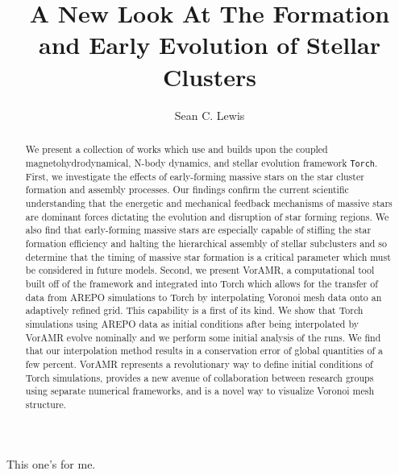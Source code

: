 \documentclass[twoside]{drexel-thesis}
\author{Sean C. Lewis}    %
\title{A New Look At The Formation and Early Evolution of Stellar Clusters}     %
\begin{document}
\begin{preamble}

\begin{dedications} %
\centerline{This one's for me.} 
\end{dedications}

\begin{acknowledgments} 

\end{acknowledgments}

\tableofcontents
\listoftables  %
\listoffigures %

\begin{abstract}
We present a collection of works which use and builds upon the coupled magnetohydrodynamical, N-body dynamics, and stellar evolution framework \texttt{Torch}. First, we investigate the effects of early-forming massive stars on the star cluster formation and assembly processes. Our findings confirm the current scientific understanding that the energetic and mechanical feedback mechanisms of massive stars are dominant forces dictating the evolution and disruption of star forming regions. We also find that early-forming massive stars are especially capable of stifling the star formation efficiency and halting the hierarchical assembly of stellar subclusters and so determine that the timing of massive star formation is a critical parameter which must be considered in future models. Second, we present VorAMR, a computational tool
built off of the  framework and integrated into Torch which allows for the transfer of data from AREPO simulations to Torch  by interpolating Voronoi mesh data onto an adaptively refined grid. This capability is a first of its kind. We show that Torch simulations using AREPO data as initial conditions after being interpolated by VorAMR evolve nominally and we perform some initial analysis of the runs. We find that our interpolation method results in a conservation error of global quantities of a few percent. VorAMR represents a revolutionary way to define initial conditions of Torch simulations, provides a new avenue of collaboration between research groups using separate numerical frameworks, and is a novel way to visualize Voronoi mesh structure. 

\end{abstract}
\end{preamble}
\end{document}
